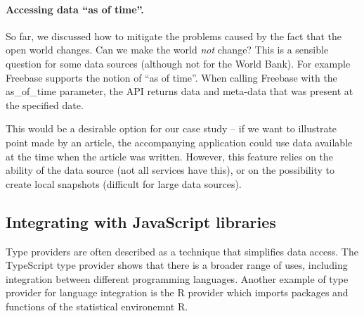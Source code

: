 \documentclass[submission,copyright,creativecommons]{eptcs}
\newcommand{\ident}[1]{\textnormal{\sffamily #1}}
\begin{document}
\vspace{-1em}
\paragraph{Accessing data ``as of time''.} 
So far, we discussed how to mitigate the problems caused by the fact that the open world changes.
Can we make the world \emph{not} change? This is a sensible question for some data sources
(although not for the World Bank). For example Freebase \cite{google-freebase} supports the 
notion of ``as of time''. When calling Freebase with the \ident{as\_of\_time} parameter, the API
returns data and meta-data that was present at the specified date.

This would be a desirable option for our case study -- if we want to illustrate point made 
by an article, the accompanying application could use data available at the time when the 
article was written. However, this feature relies on the ability of the data source (not all
services have this), or on the possibility to create local snapshots (difficult for large data
sources).


\subsection{Integrating with JavaScript libraries}
\label{sec:tp-lang}

Type providers are often described as a technique that simplifies data access. The TypeScript
type provider shows that there is a broader range of uses, including integration between different
programming languages. Another example of type provider for language integration is the R
provider \cite{fsharp-rprovider} which imports packages and functions of the statistical 
environemnt R.
\end{document}
